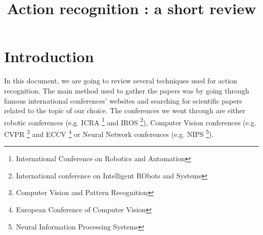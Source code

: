 \documentclass[a4paper]{article}
\begin{document}
	\title{Action recognition : a short review}


	\section{Introduction}
		In this document, we are going to review several techniques used for action recognition.
		The main method used to gather the papers was by going through famous international conferences' websites and searching for scientific papers related to the topic of our choice. The conferences we went through are either robotic conferences (e.g. ICRA \footnote{International Conference on Robotics and Automation} and IROS \footnote{International conference on Intelligent RObots and Systems}), Computer Vision conferences (e.g. CVPR \footnote{Computer Vision and Pattern Recognition} and ECCV \footnote{European Conference of Computer Vision} or Neural Network conferences (e.g. NIPS \footnote{Neural Information Processing Systems}).
\end{document}
